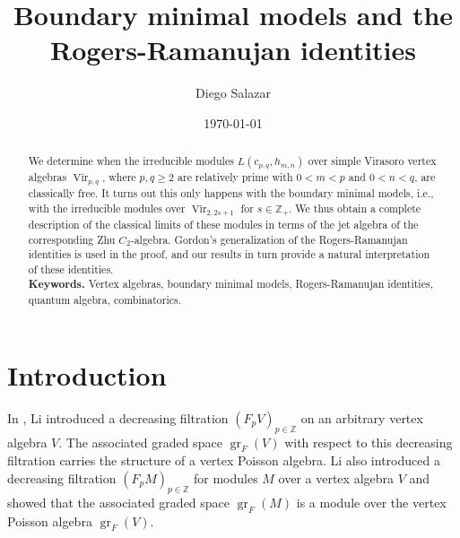 \documentclass[a4paper, 12pt, reqno]{amsart}
\theoremstyle{remark}
\DeclareMathOperator{\Vir}{Vir}
\DeclareMathOperator{\gr}{gr}
\begin{document}
\setcounter{section}{-1}

\begin{abstract}
  We determine when the irreducible modules $L(c_{p, q}, h_{m, n})$ over simple Virasoro vertex algebras $\Vir_{p, q}$, where $p, q \ge 2$ are relatively prime with $0 < m < p$ and $0 < n < q$, are classically free.
  It turns out this only happens with the boundary minimal models, i.e., with the irreducible modules over $\Vir_{2, 2s + 1}$ for $s \in \mathbb{Z}_+$.
  We thus obtain a complete description of the classical limits of these modules in terms of the jet algebra of the corresponding Zhu $C_2$-algebra. Gordon's generalization of the Rogers-Ramanujan identities is used in the proof, and our results in turn provide a natural interpretation of these identities. \\
  \smallskip
  \noindent \textbf{Keywords.} Vertex algebras, boundary minimal models, Rogers-Ramanujan identities, quantum algebra, combinatorics.
\end{abstract}

\title{Boundary minimal models and the Rogers-Ramanujan identities}
\author{Diego Salazar}
\address{Instituto de Matemática Pura e Aplicada, Rio de Janeiro, RJ, Brazil}
\date{\today}
\maketitle


\section{Introduction}
\label{sec:introduction}

In \cite{li_abelianizing_2005}, Li introduced a decreasing filtration $(F_pV)_{p \in \mathbb{Z}}$ on an arbitrary vertex algebra $V$.
The associated graded space $\gr_F(V)$ with respect to this decreasing filtration carries the structure of a vertex Poisson algebra.
Li also introduced a decreasing filtration $(F_pM)_{p \in \mathbb{Z}}$ for modules $M$ over a vertex algebra $V$ and showed that the associated graded space $\gr_F(M)$ is a module over the vertex Poisson algebra $\gr_F(V)$.
\end{document}
